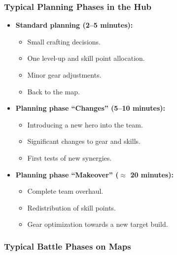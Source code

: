 \subsubsection*{Typical Planning Phases in the Hub}

\begin{itemize}
	\item \textbf{Standard planning (2--5 minutes):}
	\begin{itemize}
		\item Small crafting decisions.
		\item One level-up and skill point allocation.
		\item Minor gear adjustments.
		\item Back to the map.
	\end{itemize}
	\item \textbf{Planning phase “Changes” (5--10 minutes):}
	\begin{itemize}
		\item Introducing a new hero into the team.
		\item Significant changes to gear and skills.
		\item First tests of new synergies.
	\end{itemize}
	\item \textbf{Planning phase “Makeover” (\(\approx\) 20 minutes):}
	\begin{itemize}
		\item Complete team overhaul.
		\item Redistribution of skill points.
		\item Gear optimization towards a new target build.
	\end{itemize}
\end{itemize}

\subsubsection*{Typical Battle Phases on Maps}

